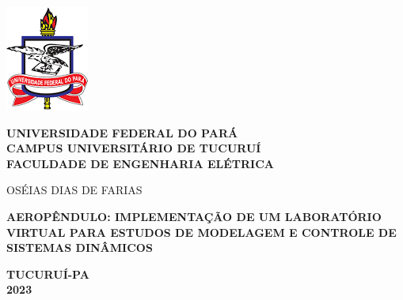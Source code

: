 	\thispagestyle{empty}
	\begin{center}

        \includegraphics[scale=0.6]{Figuras/logoufpa.png}
		
			\textbf{UNIVERSIDADE FEDERAL DO PARÁ\\
			CAMPUS UNIVERSITÁRIO DE TUCURUÍ\\
			FACULDADE DE ENGENHARIA ELÉTRICA}
			
			\vfill 
			OSÉIAS DIAS DE FARIAS
			
			
			\vfill
			
			\textbf{AEROPÊNDULO: IMPLEMENTAÇÃO DE UM LABORATÓRIO VIRTUAL PARA ESTUDOS DE MODELAGEM E CONTROLE DE SISTEMAS DINÂMICOS}
			
			\vfill \vfill
			
			\textbf{TUCURUÍ-PA\\			
			2023}
			
	\end{center}

